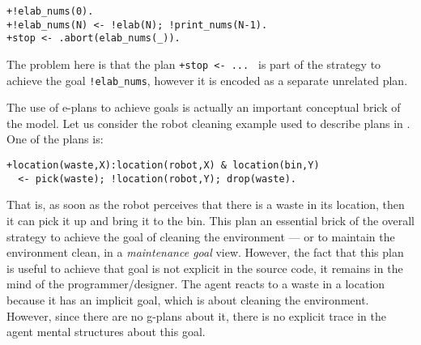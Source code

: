 \begin{small}
\begin{verbatim}
+!elab_nums(0).
+!elab_nums(N) <- !elab(N); !print_nums(N-1).		
+stop <- .abort(elab_nums(_)).
\end{verbatim}
\end{small}

\noindent The problem here is that the plan \texttt{+stop <- ... } is
part of the strategy to achieve the goal \texttt{!elab\_nums}, however
it is encoded as a separate unrelated plan.


The use of e-plans to achieve goals is actually an important
conceptual brick of the {\asl} model.
%
Let us consider the robot cleaning example used to describe plans in
{\cite{Rao96}}.
%
One of the plans is:

\begin{small}
\begin{verbatim}
+location(waste,X):location(robot,X) & location(bin,Y)
  <- pick(waste); !location(robot,Y); drop(waste).
\end{verbatim}
\end{small}

\noindent That is, as soon as the robot perceives that there is a
waste in its location, then it can pick it up and bring it to the bin.
%
This plan an essential brick of the overall strategy to achieve the
goal of cleaning the environment --- or to maintain the environment
clean, in a \emph{maintenance goal} view.
%
However, the fact that this plan is useful to achieve that goal is not
explicit in the source code, it remains in the mind of the
programmer/designer.
%
%
%
%
%
The agent reacts to a waste in a location because it has an implicit
goal, which is about cleaning the environment.
%
However, since there are no g-plans about it, there is no explicit
trace in the agent mental structures about this goal.

